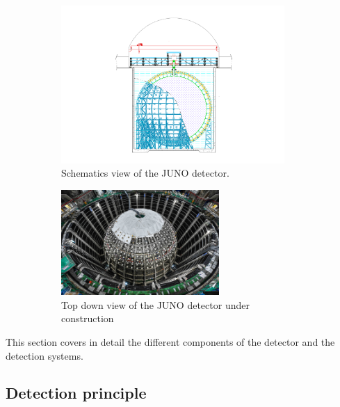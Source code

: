 \documentclass[../main.tex]{subfiles}
\begin{document}
\begin{figure}[ht]
  \centering
  \begin{subfigure}[b]{0.45\textwidth}
    \centering
    \includegraphics[height=6cm]{images/juno/drawing_schema.png}
    \caption{Schematics view of the JUNO detector.}
    \label{fig:juno:juno-schema}
  \end{subfigure}
  \hfill
  \begin{subfigure}[b]{0.45\textwidth}
    \centering
    \includegraphics[height=4cm]{images/juno/top_down_view.jpg}
    \caption{Top down view of the JUNO detector under construction}
  \end{subfigure}
  \caption{}
\end{figure}

This section covers in detail the different components of the detector and the detection systems.

\subsection{Detection principle}
\label{sec:juno:detct}
\end{document}
